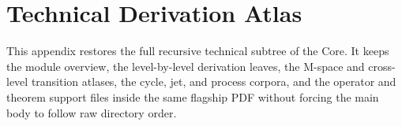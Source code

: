 \section{Technical Derivation Atlas}
\label{sec:oc-core-1-3-technical-derivation-atlas}

This appendix restores the full recursive technical subtree of the Core. It
keeps the module overview, the level-by-level derivation leaves, the M-space
and cross-level transition atlases, the cycle, jet, and process corpora, and
the operator and theorem support files inside the same flagship PDF without
forcing the main body to follow raw directory order.

\begingroup
\let\ocappendixsection\section
\let\ocappendixsubsection\subsection
\let\ocappendixsubsubsection\subsubsection
\renewcommand{\section}{\ocappendixsubsection}
\renewcommand{\subsection}{\ocappendixsubsubsection}

\endgroup
